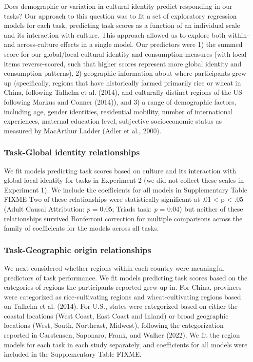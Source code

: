 \documentclass[
  man]{apa6}
\begin{document}
Does demographic or variation in cultural identity predict responding in our tasks? Our approach to this question was to fit a set of exploratory regression models for each task, predicting task scores as a function of an individual scale and its interaction with culture. This approach allowed us to explore both within- and across-culture effects in a single model. Our predictors were 1) the summed score for our global/local cultural identity and consumption measures (with local items reverse-scored, such that higher scores represent more global identity and consumption patterns), 2) geographic information about where participants grew up (specifically, regions that have historically farmed primarily rice or wheat in China, following Talhelm et al. (2014), and culturally distinct regions of the US following Markus and Conner (2014)), and 3) a range of demographic factors, including age, gender identities, residential mobility, number of international experiences, maternal education level, subjective socioeconomic status as measured by MacArthur Ladder (Adler et al., 2000).

\hypertarget{task-global-identity-relationships}{%
\subsubsection{Task-Global identity relationships}\label{task-global-identity-relationships}}

We fit models predicting task scores based on culture and its interaction with global-local identity for tasks in Experiment 2 (we did not collect these scales in Experiment 1). We include the coefficients for all models in Supplementary Table FIXME Two of these relationships were statistically significant at .01 \textless{} p \textless{} .05 (Adult Causal Attribution: \emph{p} = 0.05; Triads task: \emph{p} = 0.04) but neither of these relationships survived Bonferroni correction for multiple comparisons across the family of coefficients for the models across all tasks.

\hypertarget{task-geographic-origin-relationships}{%
\subsubsection{Task-Geographic origin relationships}\label{task-geographic-origin-relationships}}

We next considered whether regions within each country were meaningful predictors of task performance. We fit models predicting task scores based on the categories of regions the participants reported grew up in. For China, provinces were categorized as rice-cultivating regions and wheat-cultivating regions based on Talhelm et al. (2014). For U.S., states were categorized based on either the coastal locations (West Coast, East Coast and Inland) or broad geographic locations (West, South, Northeast, Midwest), following the categorization reported in Carstensen, Saponaro, Frank, and Walker (2022). We fit the region models for each task in each study separately, and coefficients for all models were included in the Supplementary Table FIXME.
\end{document}

